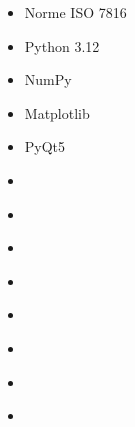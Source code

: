 \documentclass{article}
\begin{document}
\begin{tabular}
\begin{itemize}[label={}, topsep=8pt, partopsep=0pt, itemsep=0.5pt, parsep=2pt,after=\vspace*{-\baselineskip}]
        \begin{itemize}
        [label={\textcolor{gray!100}{\checkmark}}, topsep=8pt, partopsep=0pt, itemsep=0.5pt, parsep=2pt] 
            \item \textcolor{gray!100}{Norme ISO 7816}
            \item \textcolor{gray!100}{Python 3.12}
            \item \textcolor{gray!100}{NumPy}
            \item \textcolor{gray!100}{Matplotlib}
            \item \textcolor{gray!100}{PyQt5}
            \item[\textcolor{white}{\checkmark}] \textcolor{gray!100}{} %
            \item[\textcolor{white}{\checkmark}] \textcolor{gray!100}{} %
            \item[\textcolor{white}{\checkmark}] \textcolor{gray!100}{} %
            \item[\textcolor{white}{\checkmark}] \textcolor{gray!100}{} %
            \item[\textcolor{white}{\checkmark}] \textcolor{gray!100}{} %
            \item[\textcolor{white}{\checkmark}] \textcolor{gray!100}{} %
            \item[\textcolor{white}{\checkmark}] \textcolor{gray!100}{} %
            \item[\textcolor{white}{\checkmark}] \textcolor{gray!100}{} %
        \end{itemize}
    \end{itemize}
\end{tabular}

\begin{center}
\end{center}

\end{document}
